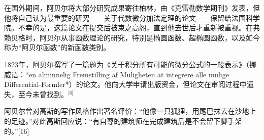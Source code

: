 在国外期间，阿贝尔将大部分研究成果寄往柏林，由《克雷勒数学期刊》发表，但他将自己认为最重要的研究——关于代数微分加法定理的论文——保留给法国科学院。不幸的是，这篇论文在提交后被束之高阁，直到他去世后才重新被重视。在弗赖贝格时，阿贝尔从事函数理论的研究，特别是椭圆函数、超椭圆函数，以及如今称为“阿贝尔函数”的新函数类别。

1823年，阿贝尔撰写了一篇题为《关于积分所有可能的微分公式的一般表示》（挪威语：*en alminnelig Fremstilling af Muligheten at integrere alle mulige Differential-Formler*）的论文。他向大学申请出版资金，但论文在审阅过程中遗失，至今未曾找到。\(^\text{[6]}\)

阿贝尔曾对高斯的写作风格作出著名评价：“他像一只狐狸，用尾巴抹去在沙地上的足迹。”对此高斯回应说：“有自尊的建筑师在完成建筑后是不会留下脚手架的。”[16]
